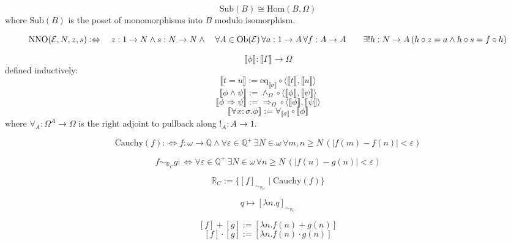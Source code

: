 \documentclass{article}
\begin{document}
\[
\text{Sub}(B) \cong \text{Hom}(B, \Omega)
\]
where $\text{Sub}(B)$ is the poset of monomorphisms into $B$ modulo isomorphism.

\[
\text{NNO}(\mathcal{E}, N, z, s) :\Leftrightarrow \\
\quad z : 1 \to N \land s : N \to N \land \\
\quad \forall A \in \text{Ob}(\mathcal{E}) \, \forall a : 1 \to A \, \forall f : A \to A \, \\
\quad\quad \exists! h : N \to A \, (h \circ z = a \land h \circ s = f \circ h)
\]

\[
\llbracket \phi \rrbracket : \llbracket \Gamma \rrbracket \to \Omega
\]
defined inductively:
\[
\llbracket t = u \rrbracket := \text{eq}_{\llbracket \sigma \rrbracket} \circ \langle \llbracket t \rrbracket, \llbracket u \rrbracket \rangle
\]
\[
\llbracket \phi \land \psi \rrbracket := \land_{\Omega} \circ \langle \llbracket \phi \rrbracket, \llbracket \psi \rrbracket \rangle
\]
\[
\llbracket \phi \Rightarrow \psi \rrbracket := \Rightarrow_{\Omega} \circ \langle \llbracket \phi \rrbracket, \llbracket \psi \rrbracket \rangle
\]
\[
\llbracket \forall x : \sigma . \phi \rrbracket := \forall_{\llbracket \sigma \rrbracket} \circ \llbracket \phi \rrbracket
\]
where $\forall_A : \Omega^A \to \Omega$ is the right adjoint to pullback along $!_A : A \to 1$.


\[
\text{Cauchy}(f) :\Leftrightarrow f : \omega \to \mathbb{Q} \land \forall \varepsilon \in \mathbb{Q}^+ \, \exists N \in \omega \, \forall m, n \geq N \, (|f(m) - f(n)| < \varepsilon)
\]

\[
f \sim_{\mathbb{R}_C} g :\Leftrightarrow \forall \varepsilon \in \mathbb{Q}^+ \, \exists N \in \omega \, \forall n \geq N \, (|f(n) - g(n)| < \varepsilon)
\]

\[
\mathbb{R}_C := \{ [f]_{\sim_{\mathbb{R}_C}} \mid \text{Cauchy}(f) \}
\]

\[
q \mapsto [\lambda n . q]_{\sim_{\mathbb{R}_C}}
\]

\[
[f] + [g] := [\lambda n . f(n) + g(n)]
\]
\[
[f] \cdot [g] := [\lambda n . f(n) \cdot g(n)]
\]
\end{document}
